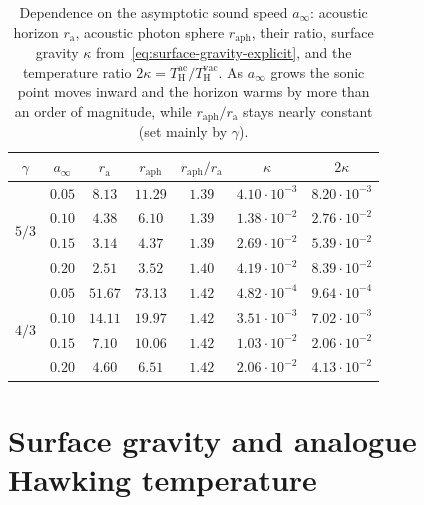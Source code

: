 \documentclass[12pt,a4paper,preprint]{elsarticle}
\begin{document}
            \begin{table}[htb]
                \centering
                \caption{Dependence on the asymptotic sound speed $a_{\infty}$: acoustic horizon $r_{\mathrm{a}}$, acoustic photon sphere $r_{\mathrm{aph}}$, their ratio, surface gravity $\kappa$ from~\eqref{eq:surface-gravity-explicit}, and the temperature ratio $2\kappa=T^{\mathrm{ac}}_{\mathrm{H}}/T^{\mathrm{vac}}_{\mathrm{H}}$. As $a_{\infty}$ grows the sonic point moves inward and the horizon warms by more than an order of magnitude, while $r_{\mathrm{aph}}/r_{\mathrm{a}}$ stays nearly constant (set mainly by $\gamma$).}
                \label{tab:ainf-scan}
                {\small
                \begin{tabular}{ccccccc}
                    \toprule
                    $\gamma$ & $a_{\infty}$ & $r_{\mathrm{a}}$ & $r_{\mathrm{aph}}$ & $r_{\mathrm{aph}}/r_{\mathrm{a}}$ & $\kappa$ & $2\kappa$ \\
                    \midrule
                    \multirow{4}{*}{$5/3$}
                    & $0.05$ & $8.13$ & $11.29$ & $1.39$ & $4.10\cdot 10^{-3}$ & $8.20\cdot 10^{-3}$ \\
                    & $0.10$ & $4.38$ & $6.10$  & $1.39$ & $1.38\cdot 10^{-2}$ & $2.76\cdot 10^{-2}$ \\
                    & $0.15$ & $3.14$ & $4.37$  & $1.39$ & $2.69\cdot 10^{-2}$ & $5.39\cdot 10^{-2}$ \\
                    & $0.20$ & $2.51$ & $3.52$  & $1.40$ & $4.19\cdot 10^{-2}$ & $8.39\cdot 10^{-2}$ \\
                    \midrule
                    \multirow{4}{*}{$4/3$}
                    & $0.05$ & $51.67$ & $73.13$ & $1.42$ & $4.82\cdot 10^{-4}$ & $9.64\cdot 10^{-4}$ \\
                    & $0.10$ & $14.11$ & $19.97$ & $1.42$ & $3.51\cdot 10^{-3}$ & $7.02\cdot 10^{-3}$ \\
                    & $0.15$ & $7.10$  & $10.06$ & $1.42$ & $1.03\cdot 10^{-2}$ & $2.06\cdot 10^{-2}$ \\
                    & $0.20$ & $4.60$  & $6.51$  & $1.42$ & $2.06\cdot 10^{-2}$ & $4.13\cdot 10^{-2}$ \\
                    \bottomrule
                \end{tabular}
                }
            \end{table}

    \section{Surface gravity and analogue Hawking temperature}\label{sec:surface-gravity}
\end{document}

